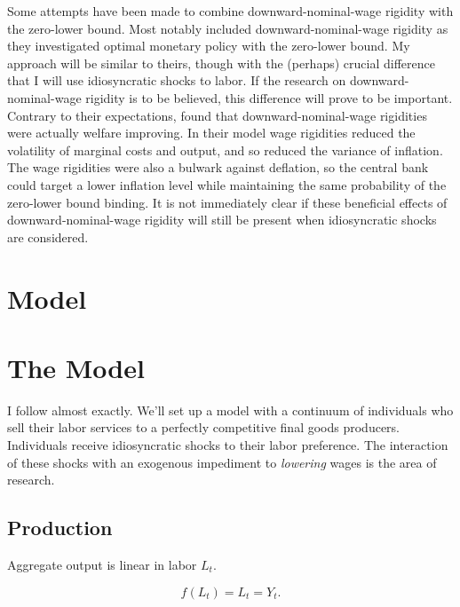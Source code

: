 \documentclass[12pt,a4paper]{scrartcl}            %
\begin{document}
Some attempts have been made to combine downward-nominal-wage rigidity with the zero-lower bound.
Most notably \cite{coibon_gorodnichenko_wieland_2012} included downward-nominal-wage rigidity as they investigated optimal monetary policy with the zero-lower bound.
My approach will be similar to theirs, though with the (perhaps) crucial difference that I will use idiosyncratic shocks to labor.
If the research on downward-nominal-wage rigidity is to be believed, this difference will prove to be important.
Contrary to their expectations, \cite{coibon_gorodnichenko_wieland_2012} found that downward-nominal-wage rigidities were actually welfare improving.
In their model wage rigidities reduced the volatility of marginal costs and output, and so reduced the variance of inflation.
The wage rigidities were also a bulwark against deflation, so the central bank could target a lower inflation level while maintaining the same probability of the zero-lower bound binding.
It is not immediately clear if these beneficial effects of downward-nominal-wage rigidity will still be present when idiosyncratic shocks are considered.

\section{Model}

\section{The Model}
\label{sec:the_model}

I follow \cite{daly_hobijn_2013} almost exactly.  We'll set up a model with a continuum of individuals who sell their labor services to a perfectly competitive final goods producers.  Individuals receive idiosyncratic shocks to their labor preference. The interaction of these shocks with an exogenous impediment to \emph{lowering} wages is the area of research.

\subsection{Production}
\label{sub:production}


Aggregate output is linear in labor $L_t$.

\begin{equation} \label{eq:agg_output}
    f(L_t) = L_t = Y_t.
\end{equation}
\end{document}
